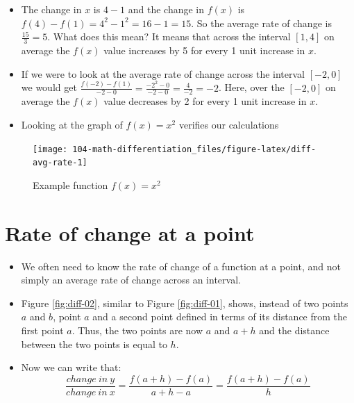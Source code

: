 \documentclass[
]{book}
\providecommand{\tightlist}{%
  \setlength{\itemsep}{0pt}\setlength{\parskip}{0pt}}
\theoremstyle{definition}
\theoremstyle{definition}
\theoremstyle{definition}
\theoremstyle{remark}
\begin{document}
\begin{itemize}
\tightlist
\item
  The change in \(x\) is \(4-1\) and the change in \(f(x)\) is \(f(4) - f(1) = 4^2 -1^2 = 16 - 1 = 15\). So the average rate of change is \(\frac{15}{3}=5\). What does this mean? It means that across the interval \([1,4]\) on average the \(f(x)\) value increases by 5 for every 1 unit increase in \(x\).
\item
  If we were to look at the average rate of change across the interval \([-2, 0]\) we would get \(\frac{f(-2)-f(1)}{-2 - 0}=\frac{-2^2-0}{-2-0}=\frac{4}{-2} = -2\). Here, over the \([-2, 0]\) on average the \(f(x)\) value decreases by 2 for every 1 unit increase in \(x\).
\item
  Looking at the graph of \(f(x)=x^2\) verifies our calculations
\end{itemize}

\begin{figure}

{\centering \texttt{[image: 104-math-differentiation\_files/figure-latex/diff-avg-rate-1]} 

}

\caption{Example function $f(x) = x^2$}\label{fig:diff-avg-rate}
\end{figure}

\hypertarget{rate-of-change-at-a-point}{%
\section{Rate of change at a point}\label{rate-of-change-at-a-point}}

\begin{itemize}
\tightlist
\item
  We often need to know the rate of change of a function at a point, and not simply an average rate of change across an interval.
\item
  Figure \ref{fig:diff-02}, similar to Figure \ref{fig:diff-01}, shows, instead of two points \(a\) and \(b\), point \(a\) and a second point defined in terms of its distance from the first point \(a\). Thus, the two points are now \(a\) and \(a + h\) and the distance between the two points is equal to \(h\).
\item
  Now we can write that:
  \[\frac{change\:in\:y}{change\:in\:x}=\frac{f(a+h)-f(a)}{a+h-a} = \frac{f(a+h)-f(a)}{h}\]
\end{itemize}
\end{document}
